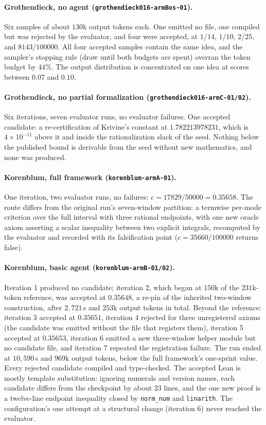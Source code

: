 \paragraph{Grothendieck, no agent (\texttt{grothendieck016-armBos-01}).}
Six samples of about $130$k output tokens each. One emitted no file, one
compiled but was rejected by the evaluator, and four were accepted, at
$1/14$, $1/10$, $2/25$, and $8143/100000$. All four accepted samples contain
the same idea, and the sampler's stopping rule (draw until both budgets are
spent) overran the token budget by $44\%$. The output distribution is
concentrated on one idea at scores between $0.07$ and $0.10$.

\paragraph{Grothendieck, no partial formalization (\texttt{grothendieck016-armC-01/02}).}
Six iterations, seven evaluator runs, no evaluator failures. One accepted
candidate: a re-certification of Krivine's constant at
$1.782213978231$, which is $4\times10^{-11}$ above it and inside the
rationalization slack of the seed. Nothing below the published bound is
derivable from the seed without new mathematics, and none was produced.

\paragraph{Korenblum, full framework (\texttt{korenblum-armA-01}).}
One iteration, two evaluator runs, no failures: $c = 17829/50000 = 0.35658$.
The route differs from the original run's seven-window partition: a termwise
per-mode criterion over the full interval with three rational endpoints, with
one new oracle axiom asserting a scalar inequality between two explicit
integrals, recomputed by the evaluator and recorded with its falsification point
($c = 35660/100000$ returns false).

\paragraph{Korenblum, basic agent (\texttt{korenblum-armB-01/02}).}
Iteration 1 produced no candidate; iteration 2, which began at $150$k of the
$231$k-token reference, was accepted at $0.35648$, a re-pin of the inherited
two-window construction, after $2{,}721$\,s and $253$k output tokens in
total. Beyond the reference: iteration 3 accepted at $0.35651$, iteration 4
rejected for three unregistered axioms (the candidate was emitted without the
file that registers them), iteration 5 accepted at $0.35653$, iteration 6
emitted a new three-window helper module but no candidate file, and
iteration 7 repeated the registration failure. The run ended at $10{,}590$\,s
and $969$k output tokens, below the full framework's one-sprint value. Every
rejected candidate compiled and type-checked. The accepted Lean is mostly
template substitution: ignoring numerals and version names, each candidate
differs from the checkpoint by about $23$ lines, and the one new proof is a
twelve-line endpoint inequality closed by \texttt{norm\_num} and
\texttt{linarith}. The configuration's one attempt at a structural change
(iteration 6) never reached the evaluator.

